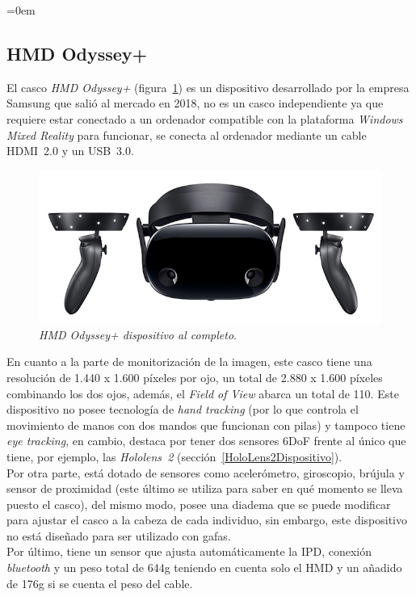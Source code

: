 \parindent=0em
\subsection{HMD Odyssey+}
\label{sec:odyssey}
\noindent


El casco \textit{HMD Odyssey+} (figura~\ref{fig:hdmOdysseyVista}) es un dispositivo desarrollado por la empresa Samsung que salió al mercado en 2018, no es un casco independiente ya que requiere estar conectado a un ordenador compatible con la plataforma \textit{Windows Mixed Reality} para funcionar, se conecta al ordenador mediante un cable HDMI~2.0 y un USB~3.0.

\begin{figure}[h]
    \centering
    \includegraphics[scale=0.6]{Images/Estado del arte/samsungOdysseyplus.jpg}
    \caption[\textit{HMD Odyssey+ dispositivo al completo}]{\textit{HMD Odyssey+ dispositivo al completo}\footnotemark.}
    \label{fig:hdmOdysseyVista}
\end{figure}

En cuanto a la parte de monitorización de la imagen, este casco tiene una resolución de 1.440 x 1.600 píxeles por ojo, un total de 2.880 x 1.600 píxeles combinando los dos ojos, además, el \textit{Field of View} abarca un total de 110\degree . Este dispositivo no posee tecnología de \textit{hand tracking} (por lo que controla el movimiento de manos con dos mandos que funcionan con pilas) y tampoco tiene \textit{eye tracking}, en cambio, destaca por tener dos sensores 6DoF frente al único que tiene, por ejemplo, las \textit{Hololens~2} (sección~\ref{HoloLens2Dispositivo}).\\

Por otra parte, está dotado de sensores como acelerómetro, giroscopio, brújula y sensor de proximidad (este último se utiliza para saber en qué momento se lleva puesto el casco), del mismo modo, posee una diadema que se puede  modificar para ajustar el casco a la cabeza de cada individuo, sin embargo, este dispositivo no está diseñado para ser utilizado con gafas.\\ 

Por último, tiene un sensor que ajusta automáticamente la IPD, conexión \textit{bluetooth} y un peso total de 644g teniendo en cuenta solo el HMD y un añadido de 176g si se cuenta el peso del cable.
